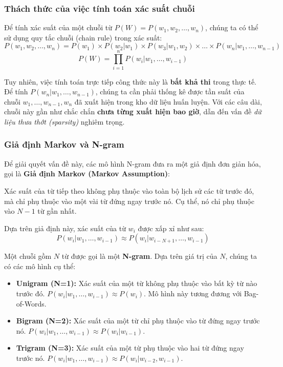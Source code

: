 \subsubsection{Thách thức của việc tính toán xác suất chuỗi}
Để tính xác suất của một chuỗi từ $P(W) = P(w_1, w_2, \dots, w_n)$, chúng ta có thể sử dụng quy tắc chuỗi (chain rule) trong xác suất:
$$ P(w_1, w_2, \dots, w_n) = P(w_1) \times P(w_2|w_1) \times P(w_3|w_1, w_2) \times \dots \times P(w_n|w_1, \dots, w_{n-1}) $$
$$ P(W) = \prod_{i=1}^{n} P(w_i | w_1, \dots, w_{i-1}) $$

Tuy nhiên, việc tính toán trực tiếp công thức này là \textbf{bất khả thi} trong thực tế. Để tính $P(w_n|w_1, \dots, w_{n-1})$, chúng ta cần phải thống kê được tần suất của chuỗi $w_1, \dots, w_{n-1}, w_n$ đã xuất hiện trong kho dữ liệu huấn luyện. Với các câu dài, chuỗi này gần như chắc chắn \textbf{chưa từng xuất hiện bao giờ}, dẫn đến vấn đề \textit{dữ liệu thưa thớt (sparsity)} nghiêm trọng.

\subsubsection{Giả định Markov và N-gram}
Để giải quyết vấn đề này, các mô hình N-gram đưa ra một giả định đơn giản hóa, gọi là \textbf{Giả định Markov (Markov Assumption)}:

\begin{tcolorbox}[
    title=Giả định Markov,
    colback=green!5!white, colframe=green!60!black, fonttitle=\bfseries
]
Xác suất của từ tiếp theo không phụ thuộc vào toàn bộ lịch sử các từ trước đó, mà chỉ phụ thuộc vào một vài từ đứng ngay trước nó. Cụ thể, nó chỉ phụ thuộc vào $N-1$ từ gần nhất.
\end{tcolorbox}

Dựa trên giả định này, xác suất của từ $w_i$ được xấp xỉ như sau:
$$ P(w_i | w_1, \dots, w_{i-1}) \approx P(w_i | w_{i-N+1}, \dots, w_{i-1}) $$

Một chuỗi gồm $N$ từ được gọi là một \textbf{N-gram}. Dựa trên giá trị của $N$, chúng ta có các mô hình cụ thể:
\begin{itemize}
    \item \textbf{Unigram (N=1):} Xác suất của một từ không phụ thuộc vào bất kỳ từ nào trước đó. $P(w_i|w_1, \dots, w_{i-1}) \approx P(w_i)$. Mô hình này tương đương với Bag-of-Words.
    \item \textbf{Bigram (N=2):} Xác suất của một từ chỉ phụ thuộc vào từ đứng ngay trước nó. $P(w_i|w_1, \dots, w_{i-1}) \approx P(w_i|w_{i-1})$.
    \item \textbf{Trigram (N=3):} Xác suất của một từ phụ thuộc vào hai từ đứng ngay trước nó. $P(w_i|w_1, \dots, w_{i-1}) \approx P(w_i|w_{i-2}, w_{i-1})$.
\end{itemize}

